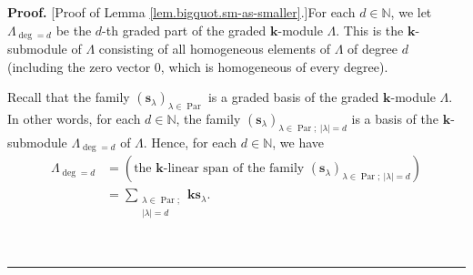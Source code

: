 \documentclass[numbers=enddot,12pt,final,onecolumn,notitlepage]{scrartcl}%
\theoremstyle{definition}
\newenvironment{proof}[1][Proof]{\noindent\textbf{#1.} }{\ \rule{0.5em}{0.5em}}
\let\sumnonlimits\sum
\renewcommand{\sum}{\sumnonlimits\limits}
\begin{document}
\begin{proof}
[Proof of Lemma \ref{lem.bigquot.sm-as-smaller}.]For each $d\in\mathbb{N}$, we
let $\Lambda_{\deg=d}$ be the $d$-th graded part of the graded $\mathbf{k}%
$-module $\Lambda$. This is the $\mathbf{k}$-submodule of $\Lambda$ consisting
of all homogeneous elements of $\Lambda$ of degree $d$ (including the zero
vector $0$, which is homogeneous of every degree).

Recall that the family $\left(  \mathbf{s}_{\lambda}\right)  _{\lambda
\in\operatorname*{Par}}$ is a graded basis of the graded $\mathbf{k}$-module
$\Lambda$. In other words, for each $d\in\mathbb{N}$, the family $\left(
\mathbf{s}_{\lambda}\right)  _{\lambda\in\operatorname*{Par};\ \left\vert
\lambda\right\vert =d}$ is a basis of the $\mathbf{k}$-submodule
$\Lambda_{\deg=d}$ of $\Lambda$. Hence, for each $d\in\mathbb{N}$, we have%
\begin{align}
\Lambda_{\deg=d}  &  =\left(  \text{the }\mathbf{k}\text{-linear span of the
family }\left(  \mathbf{s}_{\lambda}\right)  _{\lambda\in\operatorname*{Par}%
;\ \left\vert \lambda\right\vert =d}\right) \nonumber\\
&  =\sum_{\substack{\lambda\in\operatorname*{Par};\\\left\vert \lambda
\right\vert =d}}\mathbf{ks}_{\lambda}. \label{pf.lem.bigquot.sm-as-smaller.2}%
\end{align}



\end{proof}
\end{document}
